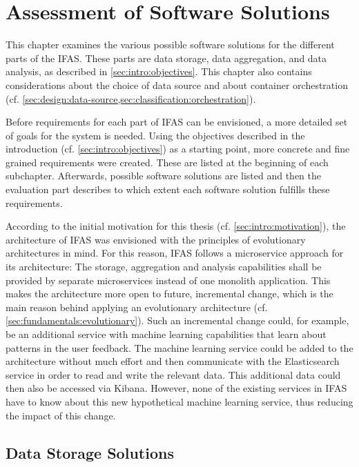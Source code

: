 %
\chapter{Assessment of Software Solutions}
\label{ch:classifications}

This chapter examines the various possible software solutions for the different parts of the \acf{IFAS}.
These parts are data storage, data aggregation, and data analysis, as described in \cref{sec:intro:objectives}.
This chapter also contains considerations about the choice of data source and about container orchestration (cf. \cref{sec:design:data-source,sec:classification:orchestration}).

Before requirements for each part of \ac{IFAS} can be envisioned, a more detailed set of goals for the system is needed.
Using the objectives described in the introduction (cf. \cref{sec:intro:objectives}) as a starting point, more concrete and fine grained requirements were created.
These are listed at the beginning of each subchapter.
Afterwards, possible software solutions are listed and then the evaluation part describes to which extent each software solution fulfills these requirements.

According to the initial motivation for this thesis (cf. \cref{sec:intro:motivation}), the architecture of \ac{IFAS} was envisioned with the principles of evolutionary architectures in mind.
For this reason, \ac{IFAS} follows a microservice approach for its architecture: The storage, aggregation and analysis capabilities shall be provided by separate microservices instead of one monolith application.
This makes the architecture more open to future, incremental change, which is the main reason behind applying an evolutionary architecture (cf. \cref{sec:fundamentals:evolutionary}).
Such an incremental change could, for example, be an additional service with machine learning capabilities that learn about patterns in the user feedback.
The machine learning service could be added to the architecture without much effort and then communicate with the Elasticsearch service in order to read and write the relevant data.
This additional data could then also be accessed via Kibana.
However, none of the existing services in \ac{IFAS} have to know about this new hypothetical machine learning service, thus reducing the impact of this change.

\section{Data Storage Solutions}
\label{sec:classifications:storage}

